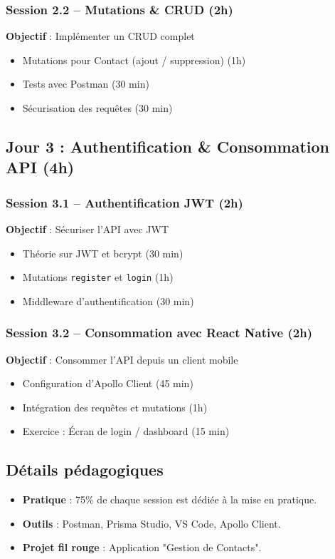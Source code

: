 \documentclass[12pt]{article}
\begin{document}
\vspace{0.3cm}
\subsubsection*{Session 2.2 – Mutations \& CRUD (2h)}
\textbf{Objectif} : Implémenter un CRUD complet
\begin{itemize}
  \item Mutations pour Contact (ajout / suppression) (1h)
  \item Tests avec Postman (30 min)
  \item Sécurisation des requêtes (30 min)
\end{itemize}

\vspace{0.5cm}
\subsection*{Jour 3 : Authentification \& Consommation API (4h)}

\subsubsection*{Session 3.1 – Authentification JWT (2h)}
\textbf{Objectif} : Sécuriser l'API avec JWT
\begin{itemize}
  \item Théorie sur JWT et bcrypt (30 min)
  \item Mutations \texttt{register} et \texttt{login} (1h)
  \item Middleware d'authentification (30 min)
\end{itemize}

\vspace{0.3cm}
\subsubsection*{Session 3.2 – Consommation avec React Native (2h)}
\textbf{Objectif} : Consommer l’API depuis un client mobile
\begin{itemize}
  \item Configuration d'Apollo Client (45 min)
  \item Intégration des requêtes et mutations (1h)
  \item Exercice : Écran de login / dashboard (15 min)
\end{itemize}

\vspace{0.5cm}
\subsection*{Détails pédagogiques}
\begin{itemize}
  \item \textbf{Pratique} : 75\% de chaque session est dédiée à la mise en pratique.
  \item \textbf{Outils} : Postman, Prisma Studio, VS Code, Apollo Client.
  \item \textbf{Projet fil rouge} : Application "Gestion de Contacts".
\end{itemize}
\end{document}

